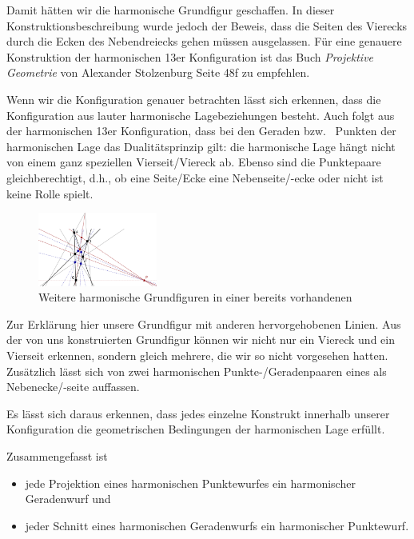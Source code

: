 \documentclass[12pt,a4paper]{article}
\begin{document}
Damit hätten wir die harmonische Grundfigur geschaffen. In dieser Konstruktionsbeschreibung wurde jedoch der Beweis, dass die Seiten des Vierecks durch die Ecken des Nebendreiecks gehen müssen ausgelassen. Für eine genauere Konstruktion der harmonischen 13er Konfiguration ist das Buch \textit{Projektive Geometrie} von Alexander Stolzenburg Seite 48f zu empfehlen.

Wenn wir die Konfiguration genauer betrachten lässt sich erkennen, dass die Konfiguration aus lauter harmonische Lagebeziehungen besteht. Auch folgt aus der harmonischen 13er Konfiguration, dass bei den Geraden bzw.~ Punkten der harmonischen Lage das Dualitätsprinzip gilt: die harmonische Lage hängt nicht von einem ganz speziellen Vierseit/Viereck ab. Ebenso sind die Punktepaare gleichberechtigt, d.h., ob eine Seite/Ecke eine Nebenseite/-ecke oder nicht ist keine Rolle spielt.

\begin{figure}
\centering
\includegraphics[width=0.35\textwidth]{Bilder/13_neu.png}
\caption{Weitere harmonische Grundfiguren in einer bereits vorhandenen}
\label{fig:13Neu}
\end{figure}

Zur Erklärung hier unsere Grundfigur mit anderen hervorgehobenen Linien. Aus der von uns konstruierten Grundfigur können wir nicht nur ein Viereck und ein Vierseit erkennen, sondern gleich mehrere, die wir so nicht vorgesehen hatten. Zusätzlich lässt sich von zwei harmonischen Punkte-/Geradenpaaren eines als Nebenecke/-seite auffassen.

Es lässt sich daraus erkennen, dass jedes einzelne Konstrukt innerhalb unserer Konfiguration die geometrischen Bedingungen der harmonischen Lage erfüllt.

Zusammengefasst ist

\begin{itemize}
\item jede Projektion eines harmonischen Punktewurfes ein harmonischer Geradenwurf und
\item jeder Schnitt eines harmonischen Geradenwurfs ein harmonischer Punktewurf.
\end{itemize}
\end{document}
